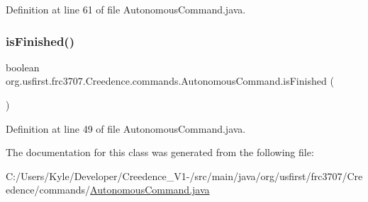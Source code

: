 Definition at line 61 of file Autonomous\+Command.\+java.

\mbox{\label{classorg_1_1usfirst_1_1frc3707_1_1_creedence_1_1commands_1_1_autonomous_command_aab1635c858244c42e519892f18e0cff2}} 
\subsubsection{\texorpdfstring{isFinished()}{isFinished()}}
{\footnotesize\ttfamily boolean org.\+usfirst.\+frc3707.\+Creedence.\+commands.\+Autonomous\+Command.\+is\+Finished (\begin{DoxyParamCaption}{ }\end{DoxyParamCaption})\hspace{0.3cm}{\ttfamily [protected]}}



Definition at line 49 of file Autonomous\+Command.\+java.



The documentation for this class was generated from the following file\+:\begin{DoxyCompactItemize}
\item 
C\+:/\+Users/\+Kyle/\+Developer/\+Creedence\+\_\+\+V1-\//src/main/java/org/usfirst/frc3707/\+Creedence/commands/\mbox{\hyperlink{_autonomous_command_8java}{Autonomous\+Command.\+java}}\end{DoxyCompactItemize}
